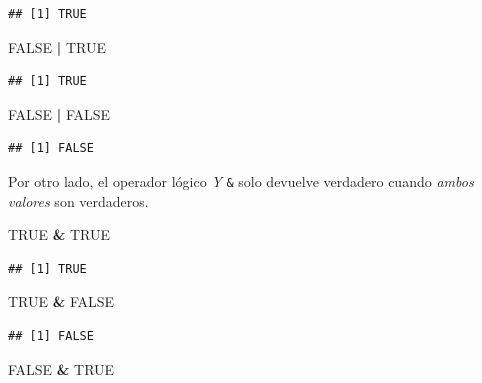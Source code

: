 \documentclass[]{book}
\newenvironment{Shaded}{\begin{snugshade}}{\end{snugshade}}
\newcommand{\OperatorTok}[1]{\textcolor[rgb]{0.81,0.36,0.00}{\textbf{#1}}}
\newcommand{\OtherTok}[1]{\textcolor[rgb]{0.56,0.35,0.01}{#1}}
\newcommand{\StringTok}[1]{\textcolor[rgb]{0.31,0.60,0.02}{#1}}
\theoremstyle{definition}
\theoremstyle{definition}
\theoremstyle{definition}
\theoremstyle{remark}
\begin{document}
\begin{verbatim}
## [1] TRUE
\end{verbatim}

\begin{Shaded}
\begin{Highlighting}[]
\OtherTok{FALSE} \OperatorTok{|}\StringTok{ }\OtherTok{TRUE}
\end{Highlighting}
\end{Shaded}

\begin{verbatim}
## [1] TRUE
\end{verbatim}

\begin{Shaded}
\begin{Highlighting}[]
\OtherTok{FALSE} \OperatorTok{|}\StringTok{ }\OtherTok{FALSE}
\end{Highlighting}
\end{Shaded}

\begin{verbatim}
## [1] FALSE
\end{verbatim}

Por otro lado, el operador lógico \emph{Y} \texttt{\&} solo devuelve
verdadero cuando \emph{ambos valores} son verdaderos.

\begin{Shaded}
\begin{Highlighting}[]
\OtherTok{TRUE} \OperatorTok{&}\StringTok{ }\OtherTok{TRUE}
\end{Highlighting}
\end{Shaded}

\begin{verbatim}
## [1] TRUE
\end{verbatim}

\begin{Shaded}
\begin{Highlighting}[]
\OtherTok{TRUE} \OperatorTok{&}\StringTok{ }\OtherTok{FALSE}
\end{Highlighting}
\end{Shaded}

\begin{verbatim}
## [1] FALSE
\end{verbatim}

\begin{Shaded}
\begin{Highlighting}[]
\OtherTok{FALSE} \OperatorTok{&}\StringTok{ }\OtherTok{TRUE}
\end{Highlighting}
\end{Shaded}
\end{document}
